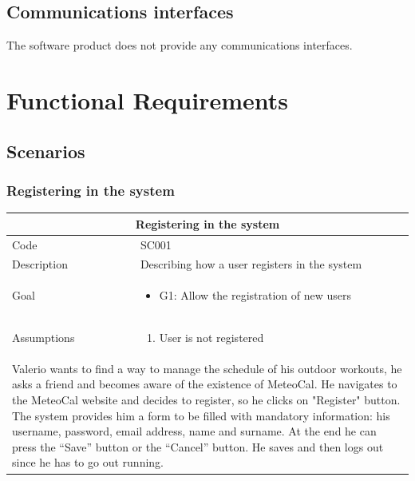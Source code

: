 \documentclass[10pt,a4paper,titlepage]{article}
\begin{document}
\subsection{Communications interfaces}
The software product does not provide any communications interfaces.

\section{Functional Requirements}
\subsection{Scenarios}

\subsubsection{Registering in the system }
\begin{tabular}{| p{3cm} | p{10cm} |}
\hline \multicolumn{2}{|c|}{\textbf{Registering in the system }} \\ 
\hline Code        & SC001 \\ 
\hline Description & Describing how a user registers in the system \\
\hline Goal        & \begin{itemize}\item G1: Allow the registration of new users\end{itemize}\\
\hline Assumptions & \begin{enumerate} \item User is not registered \end{enumerate} \\
\hline \multicolumn{2}{|p{13cm}|}{Valerio wants to find a way to manage the schedule of his outdoor workouts, he asks a friend and becomes aware of the existence of MeteoCal. He navigates to the MeteoCal website and decides to register, so he clicks on "Register" button. The system provides him a form to be filled with mandatory information: his username, password, email address, name and surname. At the end he can press the “Save” button or the “Cancel” button. He saves and then logs out since he has to go out running.}\\
\hline
\end{tabular}
\end{document}
